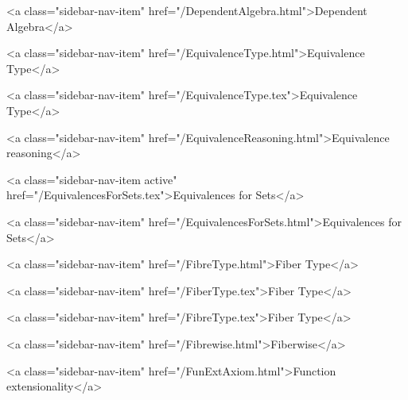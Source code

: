       
        
          <a class="sidebar-nav-item" href="/DependentAlgebra.html">Dependent Algebra</a>
        
      
    
      
        
          <a class="sidebar-nav-item" href="/EquivalenceType.html">Equivalence Type</a>
        
      
    
      
        
          <a class="sidebar-nav-item" href="/EquivalenceType.tex">Equivalence Type</a>
        
      
    
      
        
          <a class="sidebar-nav-item" href="/EquivalenceReasoning.html">Equivalence reasoning</a>
        
      
    
      
        
          <a class="sidebar-nav-item active" href="/EquivalencesForSets.tex">Equivalences for Sets</a>
        
      
    
      
        
          <a class="sidebar-nav-item" href="/EquivalencesForSets.html">Equivalences for Sets</a>
        
      
    
      
        
          <a class="sidebar-nav-item" href="/FibreType.html">Fiber Type</a>
        
      
    
      
        
          <a class="sidebar-nav-item" href="/FiberType.tex">Fiber Type</a>
        
      
    
      
        
          <a class="sidebar-nav-item" href="/FibreType.tex">Fiber Type</a>
        
      
    
      
        
          <a class="sidebar-nav-item" href="/Fibrewise.html">Fiberwise</a>
        
      
    
      
        
          <a class="sidebar-nav-item" href="/FunExtAxiom.html">Function extensionality</a>
        
